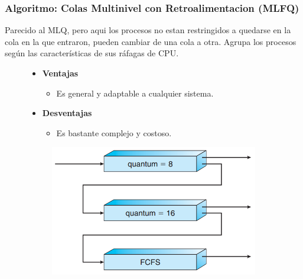 \documentclass{beamer}
\newcommand{\algTitle}{\textbf{Algoritmo}: }
\begin{document}
\begin{frame}
\frametitle{\algTitle Colas Multinivel con Retroalimentacion (MLFQ)}

Parecido al MLQ, pero aqui los procesos no estan restringidos a quedarse en la cola en la que entraron,
pueden cambiar de una cola a otra.
Agrupa los procesos según las características de sus ráfagas de CPU.

\begin{figure}[h]
	\centering
	\begin{minipage}{0.60\textwidth}
		\centering
		\begin{itemize}
			\item \textbf{Ventajas}
			\begin{itemize}
				\item Es general y adaptable a cualquier sistema.
			\end{itemize}
			\vspace{0.5cm}
			
			\item \textbf{Desventajas}
			\begin{itemize}
				\item Es bastante complejo y costoso.
			\end{itemize}
		\end{itemize}
	\end{minipage}\hfill
	\begin{minipage}{0.40\textwidth}
		\centering
		\begin{figure}
			\centering
			\includegraphics[width=1\textwidth]{img/mlfq}
		\end{figure}
	\end{minipage}\hfill
\end{figure}
\end{frame}
\end{document}
